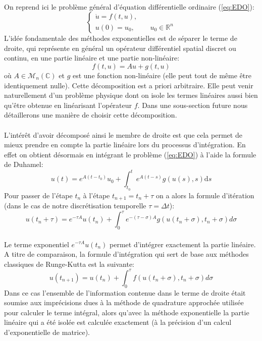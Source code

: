     \paragraph{}
    On reprend ici le problème général d'équation différentielle ordinaire (\ref{eq:EDO}):
    $$\left\{\begin{aligned}\dot{u} = f(t,u),&\\u(0) = u_0,& \quad u_0 \in \mathbb{R}^n\end{aligned}\right.$$
    L'idée fondamentale des méthodes exponentielles est de séparer le terme de droite, qui représente en général un opérateur différentiel spatial discret ou continu, en une partie linéaire et une partie non-linéaire:
    \begin{equation}
        f(t,u) = Au + g(t,u)
    \end{equation}
    où $A\in \mathcal{M}_n(\mathbb{C})$ et $g$ est une fonction non-linéaire (elle peut tout de même être identiquement nulle). Cette décomposition est a priori arbitraire. Elle peut venir naturellement d'un problème physique dont on isole les termes linéaires aussi bien qu'être obtenue en linéarisant l'opérateur $f$. Dans une sous-section future nous détaillerons une manière de choisir cette décomposition.

    \paragraph{}
    L'intérêt d'avoir décomposé ainsi le membre de droite est que cela permet de mieux prendre en compte la partie linéaire lors du processus d'intégration. En effet on obtient désormais en intégrant le problème (\ref{eq:EDO}) à l'aide la formule de Duhamel:
    \begin{equation} 
        u(t)=e^{A(t-t_{0})} u_{0}+\int_{t_{0}}^{t} e^{A(t-s)} g(u(s), s) \text{d} s
    \end{equation}
    Pour passer de l'étape $t_n$ à l'étape $t_{n+1} = t_n +\tau$ on a alors la formule d'itération (dans le cas de notre discrétisation temporelle $\tau = \Delta t$):
    \begin{equation} 
        u\left(t_{n}+\tau \right)=e^{-\tau A} u\left(t_{n}\right)+\int_{0}^{\tau} e^{-(\tau-\sigma) A} g\left(u\left(t_{n}+\sigma\right),t_n+\sigma\right) d \sigma
        \label{eq:itExp}
    \end{equation}

    \paragraph{}
    Le terme exponentiel $e^{-\tau A} u\left(t_{n}\right)$ permet d'intégrer exactement la partie linéaire. A titre de comparaison, la formule d'intégration qui sert de base aux méthodes classiques de Runge-Kutta est la suivante:
    $$u(t_{n+1}) = u(t_n) + \int_{0}^{\tau} f\left(u\left(t_{n}+\sigma\right),t_n+\sigma\right) d \sigma$$
    Dans ce cas l'ensemble de l'information contenue dans le terme de droite était soumise aux imprécisions dues à la méthode de quadrature approchée utilisée pour calculer le terme intégral, alors qu'avec la méthode exponentielle la partie linéaire qui a été isolée est calculée exactement (à la précision d'un calcul d'exponentielle de matrice).

